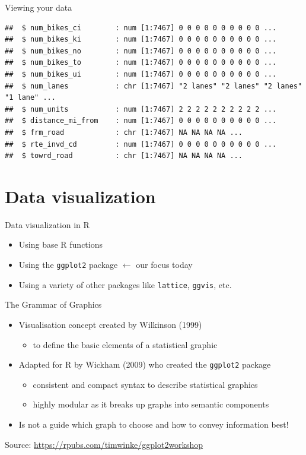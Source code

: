 \documentclass[
  ignorenonframetext,
]{beamer}
\providecommand{\tightlist}{%
  \setlength{\itemsep}{0pt}\setlength{\parskip}{0pt}}
\begin{document}
\begin{frame}[fragile]{Viewing your data}
\begin{verbatim}
##  $ num_bikes_ci        : num [1:7467] 0 0 0 0 0 0 0 0 0 0 ...
##  $ num_bikes_ki        : num [1:7467] 0 0 0 0 0 0 0 0 0 0 ...
##  $ num_bikes_no        : num [1:7467] 0 0 0 0 0 0 0 0 0 0 ...
##  $ num_bikes_to        : num [1:7467] 0 0 0 0 0 0 0 0 0 0 ...
##  $ num_bikes_ui        : num [1:7467] 0 0 0 0 0 0 0 0 0 0 ...
##  $ num_lanes           : chr [1:7467] "2 lanes" "2 lanes" "2 lanes" "1 lane" ...
##  $ num_units           : num [1:7467] 2 2 2 2 2 2 2 2 2 2 ...
##  $ distance_mi_from    : num [1:7467] 0 0 0 0 0 0 0 0 0 0 ...
##  $ frm_road            : chr [1:7467] NA NA NA NA ...
##  $ rte_invd_cd         : num [1:7467] 0 0 0 0 0 0 0 0 0 0 ...
##  $ towrd_road          : chr [1:7467] NA NA NA NA ...
\end{verbatim}
\end{frame}

\hypertarget{data-visualization}{%
\section{Data visualization}\label{data-visualization}}

\begin{frame}[fragile]{Data visualization in R}
\protect\hypertarget{data-visualization-in-r}{}
\begin{itemize}
\item
  Using base R functions
\item
  Using the \texttt{ggplot2} package \(\leftarrow\) our focus today
\item
  Using a variety of other packages like \texttt{lattice},
  \texttt{ggvis}, etc.
\end{itemize}
\end{frame}

\begin{frame}[fragile]{The Grammar of Graphics}
\protect\hypertarget{the-grammar-of-graphics}{}
\begin{itemize}
\tightlist
\item
  Visualisation concept created by Wilkinson (1999)

  \begin{itemize}
  \tightlist
  \item
    to define the basic elements of a statistical graphic
  \end{itemize}
\item
  Adapted for R by Wickham (2009) who created the \texttt{ggplot2}
  package

  \begin{itemize}
  \tightlist
  \item
    consistent and compact syntax to describe statistical graphics
  \item
    highly modular as it breaks up graphs into semantic components
  \end{itemize}
\item
  Is not a guide which graph to choose and how to convey information
  best!
\end{itemize}

Source: \url{https://rpubs.com/timwinke/ggplot2workshop}
\end{frame}
\end{document}
